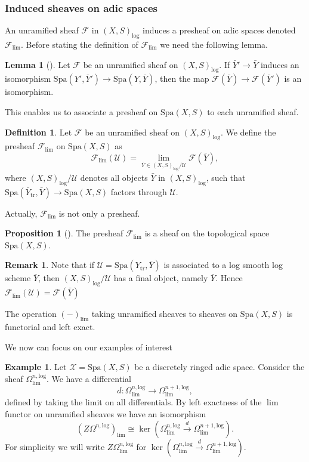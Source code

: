 \documentclass{amsart}
\def\Spa{\textrm{Spa}}
\theoremstyle{definition}
\newtheorem{definition}[theorem]{Definition}
\newtheorem{example}[theorem]{Example}
\newtheorem{proposition}[theorem]{Proposition}
\newtheorem{lemma}[theorem]{Lemma}
\newtheorem{remark}[theorem]{Remark}
\newcommand\llog{\mathrm{log}}
\numberwithin{equation}{section}
\begin{document}
\subsubsection*{Induced sheaves on adic spaces}
An unramified sheaf $\mathcal{F}$ in $(X,S)_\llog$ induces a presheaf on adic spaces denoted $\mathcal{F}_{\lim}$. Before stating the definition of $\mathcal{F}_{\lim}$ we need the following lemma.
\begin{lemma}[{\cite[Lemma 6.3]{LogDiff}}]
	Let $\mathcal{F}$ be an unramified sheaf on $(X,S)_\llog$. If $\bar{Y}'\to \bar{Y}$ induces an isomorphism $\Spa(Y',\bar{Y}')\to \Spa(Y,\bar{Y})$, then the map $\mathcal{F}(\bar{Y})\to \mathcal{F}(\bar{Y}')$ is an isomorphism.
\end{lemma}
This enables us to associate a presheaf on $\Spa(X,S)$ to each unramified sheaf.
\begin{definition}
	Let $\mathcal{F}$ be an unramified sheaf on $(X,S)_\llog$. We define the presheaf $\mathcal{F}_{\lim}$ on $\Spa(X,S)$ as 
	$$\mathcal{F}_{\lim}(\mathcal{U})= \lim\limits_{\bar{Y}\in (X,S)_\llog/\mathcal{U}}\mathcal{F}(\bar{Y}),$$
	where $(X,S)_\llog/\mathcal{U}$ denotes all objects $\bar{Y}$ in $(X,S)_\llog$, such that $\Spa(\bar{Y}_\textrm{tr},\bar{Y})\to \Spa(X,S)$ factors through $\mathcal{U}$.
\end{definition}
Actually, $\mathcal{F}_{\lim}$ is not only a presheaf.
\begin{proposition}[{\cite[Proposition 8.9]{LogDiff}}]
	The presheaf $\mathcal{F}_{\lim}$ is a sheaf on the topological space $\Spa(X,S)$.
\end{proposition}
\begin{remark}
	Note that if $\mathcal{U}=\Spa(Y_{\textrm{tr}},\bar{Y})$ is associated to a log smooth log scheme $\bar{Y}$, then $(X,S)_{\log}/\mathcal{U}$ has a final object, namely $\bar{Y}$. Hence $\mathcal{F}_{\lim}(\mathcal{U})=\mathcal{F}(\bar{Y})$
	
	The operation $(-)_{\lim}$ taking unramified sheaves to sheaves on $\Spa(X,S)$
	is functorial and left exact. 
\end{remark}
We now can focus on our examples of interest
\begin{example}
	Let $\mathcal{X}=\Spa(X,S)$ be a discretely ringed adic space. Consider the sheaf $\Omega^{n,\llog}_{\lim}$. We have a differential 
		\[
		d:\Omega^{n,\llog}_{\lim}\to\Omega^{n+1,\llog}_{\lim},
		\]
		defined by  taking the limit on all differentials.
		By left exactness of the $\lim$ functor on unramified sheaves we have an isomorphism
		\[
		(Z\Omega^{n,\llog})_{\lim}\cong \ker(\Omega^{n,\llog}_{\lim}\xrightarrow{d}\Omega^{n+1,\llog}_{\lim}).
		\]
		For simplicity we will write $Z\Omega^{n,\llog}_{\lim}$ for $\ker(\Omega^{n,\llog}_{\lim}\xrightarrow{d}\Omega^{n+1,\llog}_{\lim})$.
\end{example}
\end{document}
